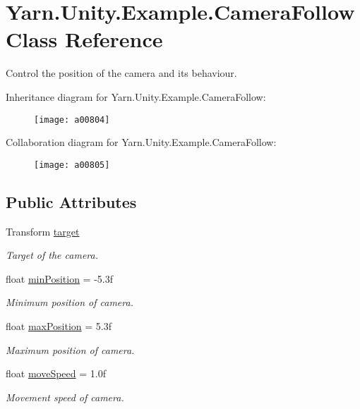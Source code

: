 \hypertarget{a00049}{\section{Yarn.\-Unity.\-Example.\-Camera\-Follow Class Reference}
\label{a00049}
}


Control the position of the camera and its behaviour.  




Inheritance diagram for Yarn.\-Unity.\-Example.\-Camera\-Follow\-:
\nopagebreak
\begin{figure}[H]
\begin{center}
\leavevmode
\texttt{[image: a00804]}
\end{center}
\end{figure}


Collaboration diagram for Yarn.\-Unity.\-Example.\-Camera\-Follow\-:
\nopagebreak
\begin{figure}[H]
\begin{center}
\leavevmode
\texttt{[image: a00805]}
\end{center}
\end{figure}
\subsection*{Public Attributes}
\begin{DoxyCompactItemize}
\item 
Transform \hyperlink{a00049_aa5d6958fb14a14ebb74e21c372fcca8b}{target}
\begin{DoxyCompactList}\small\item\em Target of the camera. \end{DoxyCompactList}\item 
float \hyperlink{a00049_a08c6f6c0ea423c21af99e4b5467d3c9b}{min\-Position} = -\/5.\-3f
\begin{DoxyCompactList}\small\item\em Minimum position of camera. \end{DoxyCompactList}\item 
float \hyperlink{a00049_abb0154dcbc2a7d43795beacd61a56de4}{max\-Position} = 5.\-3f
\begin{DoxyCompactList}\small\item\em Maximum position of camera. \end{DoxyCompactList}\item 
float \hyperlink{a00049_a3d4f2efe9c2cee8c7ff797cac03f27ec}{move\-Speed} = 1.\-0f
\begin{DoxyCompactList}\small\item\em Movement speed of camera. \end{DoxyCompactList}\end{DoxyCompactItemize}
